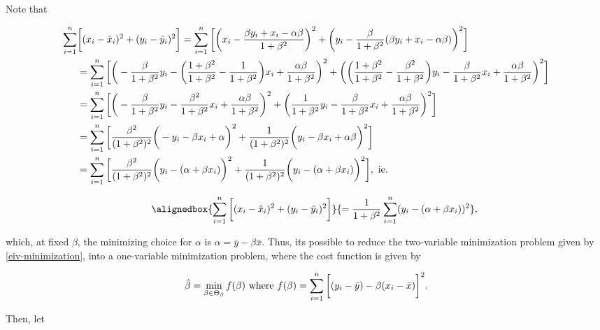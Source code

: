 \documentclass{homework}
\begin{document}
Note that 

\begin{align*}
    \sum_{i=1}^{n} & \bigg[(x_i - \hat{x}_i)^2+(y_i - \hat{y}_i)^2 \bigg] = \sum_{i=1}^{n} \bigg[\bigg(x_i - \frac{\beta y_i+x_i-\alpha\beta}{1+\beta ^2} \bigg)^2 + \bigg(y_i- \frac{\beta}{1+\beta ^2}(\beta y_i + x_i - \alpha \beta )\bigg)^2  \bigg] \\
    &= \sum_{i=1}^{n} \bigg[\bigg(- \frac{\beta}{1+\beta^2} y_i - \bigg(\frac{1+\beta^2}{1+\beta^2}-\frac{1}{1+\beta^2} \bigg)x_i + \frac{\alpha \beta}{1+\beta^2}\bigg)^2 + \bigg(\bigg(\frac{1+\beta^2}{1+\beta^2}- \frac{\beta^2}{1+\beta^2} \bigg)y_i - \frac{\beta}{1+\beta^2}x_i + \frac{\alpha \beta}{1+\beta^2} \bigg)^2 \bigg] \\
    &= \sum_{i=1}^{n} \bigg[\bigg(- \frac{\beta}{1+\beta^2} y_i -\frac{\beta^2}{1+\beta^2} x_i + \frac{\alpha \beta}{1+\beta^2}\bigg)^2 + \bigg( \frac{1}{1+\beta^2}y_i - \frac{\beta}{1+\beta^2}x_i + \frac{\alpha \beta}{1+\beta^2} \bigg)^2 \bigg] \\ 
    &= \sum_{i=1}^{n} \bigg[\frac{\beta^2}{(1+\beta^2)^2}\bigg(-y_i - \beta x_i + \alpha \bigg)^2 + \frac{1}{(1+\beta^2)^2}\bigg(y_i - \beta x_i + \alpha \beta\bigg)^2 \bigg]\\ 
    &= \sum_{i=1}^{n} \bigg[\frac{\beta^2}{(1+\beta^2)^2}\bigg(y_i - (\alpha +\beta x_i) \bigg)^2 + \frac{1}{(1+\beta^2)^2}\bigg(y_i - (\alpha +\beta x_i)\bigg)^2 \bigg], \textnormal{ ie. }
\end{align*}

\begin{align} 
    \blank & \blank & 
    \alignedbox{\summation \bigg[(x_i - \hat{x}_i)^2+(y_i - \hat{y}_i)^2 \bigg]}{= \frac{1}{1+\beta^2} \summation (y_i - (\alpha +\beta x_i))^2},
    \label{eiv identity}
\end{align}

which, at fixed $\beta$, the minimizing choice for $\alpha$ is $\alpha = \bar{y} - \beta \bar{x}$. Thus, its possible to reduce the two-variable minimization problem given by \eqref{eiv-minimization}, into a one-variable minimization problem, where the cost function is given by

\begin{equation}
    \hat{\beta} = \min_{\beta  \in \Theta_{\beta}} f(\beta) \textnormal{ where } f(\beta) =  \sum_{i=1}^{n} \bigg[(y_i - \bar{y})- \beta(x_i - \bar{x})\bigg]^2
    \label{eiv-minimization}.
\end{equation}

Then, let 
\end{document}
